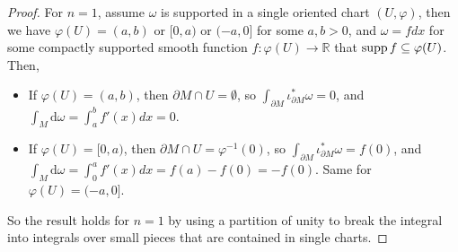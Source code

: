 \documentclass[../main.tex]{subfiles}
\begin{document}
\begin{proof}
  For $n=1$, assume $\omega$ is supported in a single oriented chart $(U,\varphi)$, then we have $\varphi(U) = (a,b)$ or $[0, a)$ or $(-a,0]$ for some $a,b > 0$, and $\omega = f dx$ for some compactly supported smooth function $f: \varphi(U) \to \mathbb{R}$ that $\operatorname{supp} f \subseteq \varphi(U)$. Then,
  \begin{itemize}
    \item If $\varphi(U) = (a,b)$, then $\partial M \cap U = \emptyset$, so $\int_{\partial M} \iota^*_{\partial M} \omega = 0$, and $\int_M \mathrm{d}\omega = \int_a^b f'(x) dx = 0$.
    \item If $\varphi(U) = [0,a)$, then $\partial M \cap U = \varphi^{-1}(0)$, so $\int_{\partial M} \iota^*_{\partial M} \omega = f(0)$, and $\int_M \mathrm{d}\omega = \int_0^a f'(x) dx = f(a) - f(0) = -f(0)$. Same for $\varphi(U) = (-a,0]$.
  \end{itemize}
  So the result holds for $n=1$ by using a partition of unity to break the integral into integrals over small pieces that are contained in single charts.


\end{proof}
\end{document}
